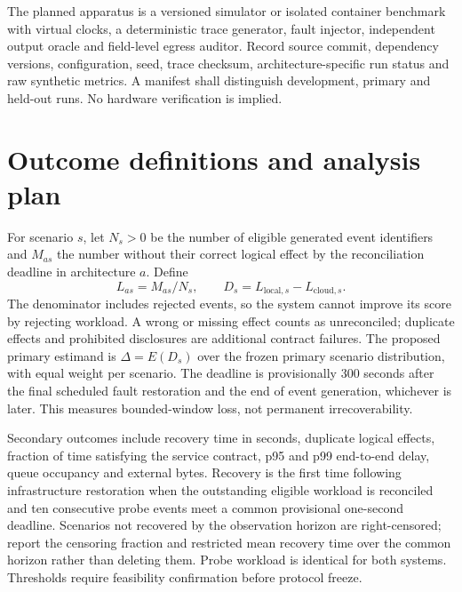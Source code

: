\documentclass[11pt,a4paper]{article}
\begin{document}
The planned apparatus is a versioned simulator or isolated container benchmark with virtual clocks, a deterministic trace generator, fault injector, independent output oracle and field-level egress auditor. Record source commit, dependency versions, configuration, seed, trace checksum, architecture-specific run status and raw synthetic metrics. A manifest shall distinguish development, primary and held-out runs. No hardware verification is implied.

\section{Outcome definitions and analysis plan}
For scenario \(s\), let \(N_s>0\) be the number of eligible generated event identifiers and \(M_{as}\) the number without their correct logical effect by the reconciliation deadline in architecture \(a\). Define
\[
 L_{as}=M_{as}/N_s,\qquad D_s=L_{\mathrm{local},s}-L_{\mathrm{cloud},s}.
\]
The denominator includes rejected events, so the system cannot improve its score by rejecting workload. A wrong or missing effect counts as unreconciled; duplicate effects and prohibited disclosures are additional contract failures. The proposed primary estimand is \(\Delta=E(D_s)\) over the frozen primary scenario distribution, with equal weight per scenario. The deadline is provisionally 300 seconds after the final scheduled fault restoration and the end of event generation, whichever is later. This measures bounded-window loss, not permanent irrecoverability.

Secondary outcomes include recovery time in seconds, duplicate logical effects, fraction of time satisfying the service contract, p95 and p99 end-to-end delay, queue occupancy and external bytes. Recovery is the first time following infrastructure restoration when the outstanding eligible workload is reconciled and ten consecutive probe events meet a common provisional one-second deadline. Scenarios not recovered by the observation horizon are right-censored; report the censoring fraction and restricted mean recovery time over the common horizon rather than deleting them. Probe workload is identical for both systems. Thresholds require feasibility confirmation before protocol freeze.
\end{document}
